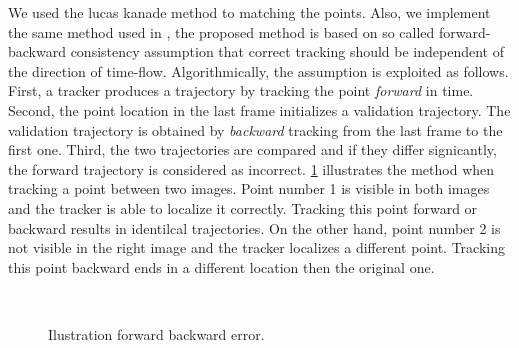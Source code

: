 \documentclass[12pt, a4paper, titlepage,twoside,openright]{article}
\begin{document}
We used the lucas kanade method to matching the points. Also, we implement the same method used in \cite{medianFlow}, the proposed method is based on so called forward-backward consistency assumption that correct tracking should be independent of the direction of time-flow. Algorithmically, the assumption is exploited as follows. First, a tracker produces a trajectory by tracking the point \textit{forward} in time. Second, the point location in the last frame initializes a validation trajectory. The validation trajectory is obtained by \textit{backward} tracking from the last frame to the first one. Third, the two trajectories are compared and if they differ signicantly, the forward trajectory is considered as incorrect. \ref{motion23} illustrates the method when tracking a point between two images. Point number 1 is visible in both images and the tracker is able to localize it correctly. Tracking this point forward or backward results in identilcal trajectories. On the other hand, point number 2 is not visible in the right image and the tracker localizes a different point. Tracking this point backward ends in a different location then the original one.


%

\begin{figure}[H]
		
\centering

\\
\caption{Ilustration forward backward error.}
\label{motion23}
\end{figure}
\end{document}
